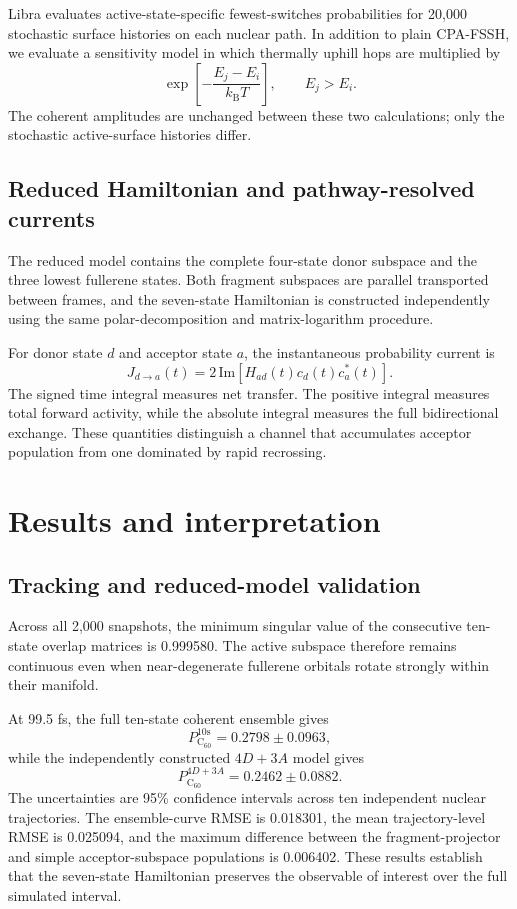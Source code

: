 \documentclass[11pt]{article}
\newcommand{\Csixty}{\mathrm{C}_{60}}
\begin{document}
Libra evaluates active-state-specific fewest-switches probabilities for 20,000 stochastic surface histories on each nuclear path. In addition to plain CPA-FSSH, we evaluate a sensitivity model in which thermally uphill hops are multiplied by
\begin{equation}
 \exp\left[-\frac{E_j-E_i}{k_{\mathrm B}T}\right],\qquad E_j>E_i.
\end{equation}
The coherent amplitudes are unchanged between these two calculations; only the stochastic active-surface histories differ.

\subsection{Reduced Hamiltonian and pathway-resolved currents}
The reduced model contains the complete four-state donor subspace and the three lowest fullerene states. Both fragment subspaces are parallel transported between frames, and the seven-state Hamiltonian is constructed independently using the same polar-decomposition and matrix-logarithm procedure.

For donor state $d$ and acceptor state $a$, the instantaneous probability current is
\begin{equation}
 J_{d\rightarrow a}(t)=2\,\mathrm{Im}\left[H_{ad}(t)c_d(t)c_a^*(t)\right].
\end{equation}
The signed time integral measures net transfer. The positive integral measures total forward activity, while the absolute integral measures the full bidirectional exchange. These quantities distinguish a channel that accumulates acceptor population from one dominated by rapid recrossing.

\section{Results and interpretation}
\subsection{Tracking and reduced-model validation}
Across all 2,000 snapshots, the minimum singular value of the consecutive ten-state overlap matrices is 0.999580. The active subspace therefore remains continuous even when near-degenerate fullerene orbitals rotate strongly within their manifold.

At 99.5 fs, the full ten-state coherent ensemble gives
\begin{equation}
 P_{\Csixty}^{10\mathrm{s}}=0.2798\pm0.0963,
\end{equation}
while the independently constructed $4D+3A$ model gives
\begin{equation}
 P_{\Csixty}^{4D+3A}=0.2462\pm0.0882.
\end{equation}
The uncertainties are 95\% confidence intervals across ten independent nuclear trajectories. The ensemble-curve RMSE is 0.018301, the mean trajectory-level RMSE is 0.025094, and the maximum difference between the fragment-projector and simple acceptor-subspace populations is 0.006402. These results establish that the seven-state Hamiltonian preserves the observable of interest over the full simulated interval.
\end{document}
